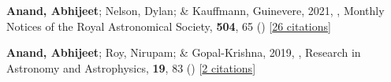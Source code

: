 \item[{\color{numcolor}\scriptsize2}] \textbf{Anand, Abhijeet}; Nelson, Dylan; \& Kauffmann, Guinevere, 2021, , Monthly Notices of the Royal Astronomical Society, \textbf{504}, 65 () [\href{https://ui.adsabs.harvard.edu/abs/2021MNRAS.504...65A}{26 citations}]

\item[{\color{numcolor}\scriptsize1}] \textbf{Anand, Abhijeet}; Roy, Nirupam; \& Gopal-Krishna, 2019, , Research in Astronomy and Astrophysics, \textbf{19}, 83 () [\href{https://ui.adsabs.harvard.edu/abs/2019RAA....19...83A}{2 citations}]